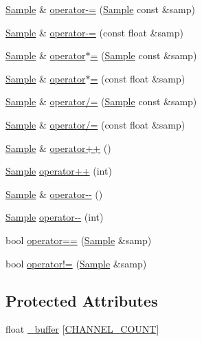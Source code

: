 \begin{DoxyCompactItemize}
\item 
\hyperlink{classDSG_1_1Sample}{Sample} \& \hyperlink{classDSG_1_1Sample_a3e8c9bfb07c9a1abfbb925e943a77bf2}{operator-\/=} (\hyperlink{classDSG_1_1Sample}{Sample} const \&samp)
\item 
\hyperlink{classDSG_1_1Sample}{Sample} \& \hyperlink{classDSG_1_1Sample_a5c51de986eb773feaa20f3d7408f61fc}{operator-\/=} (const float \&samp)
\item 
\hyperlink{classDSG_1_1Sample}{Sample} \& \hyperlink{classDSG_1_1Sample_acfa0e39c59c941feda43cbf2163d3a3f}{operator$\ast$=} (\hyperlink{classDSG_1_1Sample}{Sample} const \&samp)
\item 
\hyperlink{classDSG_1_1Sample}{Sample} \& \hyperlink{classDSG_1_1Sample_ac7b0d51f729b74652eb942cac16231be}{operator$\ast$=} (const float \&samp)
\item 
\hyperlink{classDSG_1_1Sample}{Sample} \& \hyperlink{classDSG_1_1Sample_a426f95e1ca00e31f597e7974aa348fea}{operator/=} (\hyperlink{classDSG_1_1Sample}{Sample} const \&samp)
\item 
\hyperlink{classDSG_1_1Sample}{Sample} \& \hyperlink{classDSG_1_1Sample_a4949b575aa87fbe23d1f94ebc59a39ad}{operator/=} (const float \&samp)
\item 
\hyperlink{classDSG_1_1Sample}{Sample} \& \hyperlink{classDSG_1_1Sample_ac208ffaa812c14088a87d808048e5901}{operator++} ()
\item 
\hyperlink{classDSG_1_1Sample}{Sample} \hyperlink{classDSG_1_1Sample_a8a46b665400a64135dfa47626775a768}{operator++} (int)
\item 
\hyperlink{classDSG_1_1Sample}{Sample} \& \hyperlink{classDSG_1_1Sample_a592fa599991ca50854a43e6bdbe11ac5}{operator-\/-\/} ()
\item 
\hyperlink{classDSG_1_1Sample}{Sample} \hyperlink{classDSG_1_1Sample_a515bd70b0ad0a894bc279bc772ca4053}{operator-\/-\/} (int)
\item 
bool \hyperlink{classDSG_1_1Sample_a60ee416ba78328059219bf9ef2f716d8}{operator==} (\hyperlink{classDSG_1_1Sample}{Sample} \&samp)
\item 
bool \hyperlink{classDSG_1_1Sample_aaea02c560205ffe02fc0c2dda296f3f8}{operator!=} (\hyperlink{classDSG_1_1Sample}{Sample} \&samp)
\end{DoxyCompactItemize}
\subsection*{Protected Attributes}
\begin{DoxyCompactItemize}
\item 
float \hyperlink{classDSG_1_1Sample_ab3b67b009491583e03d8e97d579e67c2}{\+\_\+buffer} \mbox{[}\hyperlink{Sample_8h_a29e42927003b0aa647ee45965f4ccb07}{C\+H\+A\+N\+N\+E\+L\+\_\+\+C\+O\+U\+N\+T}\mbox{]}
\end{DoxyCompactItemize}
